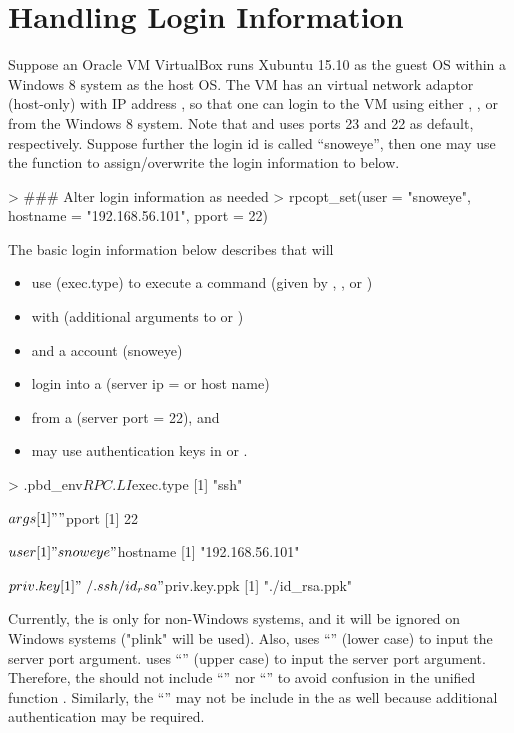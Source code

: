 \section[Handling Login Information]{Handling Login Information}
\label{sec:handling_login_information}

Suppose an Oracle VM VirtualBox runs Xubuntu 15.10 as the guest OS within a
Windows 8 system as the host OS.
The VM has an virtual network adaptor (host-only)
with IP address , so that one can
login to the VM using either , , or 
from the Windows 8 system.
Note that  and  uses ports 23 and 22 as default,
respectively.
Suppose further the login id is called ``snoweye'', then one may use
the function  to assign/overwrite the login information to
 below.
\begin{Code}[title=Set login information]
> ### Alter login information as needed
> rpcopt_set(user = "snoweye", hostname = "192.168.56.101", pport = 22)
\end{Code}

The basic login information  below describes that
 will
\begin{itemize}
\item use  (exec.type) to execute a command
      (given by , , or )
\item with  (additional arguments to  or )
\item and a  account (snoweye)
\item login into a  (server ip =  or
      host name)
\item from a  (server port = 22), and
\item may use authentication keys in  or .
\end{itemize}
\begin{Code}[title=Basic \code{RPC.LI}]
> .pbd_env$RPC.LI
$exec.type
[1] "ssh"

$args
[1] ""

$pport
[1] 22

$user
[1] "snoweye"

$hostname
[1] "192.168.56.101"

$priv.key
[1] "~/.ssh/id_rsa"

$priv.key.ppk
[1] "./id_rsa.ppk"
\end{Code}
Currently, the  is only for non-Windows systems, and it
will be ignored on Windows systems ("plink" will be used).
Also,  uses ``'' (lower case) to input the server port
argument.
 uses ``'' (upper case) to input the server port
argument.
Therefore, the  should not include ``'' nor ``''
to avoid confusion in the unified function .
Similarly, the ``'' may not be include in the  as well
because additional authentication may be required.

